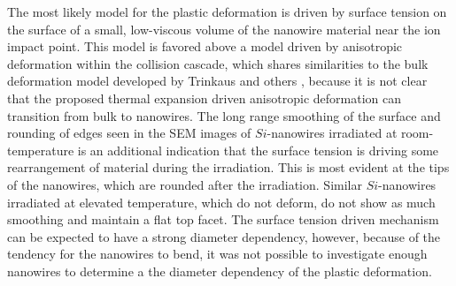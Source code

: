 The most likely model for the plastic deformation is driven by surface tension on the surface of a small, low-viscous volume of the nanowire material near the ion impact point. This model is favored above a model driven by anisotropic deformation within the collision cascade, which shares similarities to the bulk deformation model developed by Trinkaus and others \cite{trinkaus_viscoelastic_1995,baumer_prediction_2014}, because it is not clear that the proposed thermal expansion driven anisotropic deformation can transition from bulk to nanowires. The long range smoothing of the surface and rounding of edges seen in the SEM images of $Si$-nanowires irradiated at room-temperature is an additional indication that the surface tension is driving some rearrangement of material during the irradiation. This is most evident at the tips of the nanowires, which are rounded after the irradiation. Similar $Si$-nanowires irradiated at elevated temperature, which do not deform, do not show as much smoothing and maintain a flat top facet. The surface tension driven mechanism can be expected to have a strong diameter dependency, however, because of the tendency for the nanowires to bend, it was not possible to investigate enough nanowires to determine a the diameter dependency of the plastic deformation. 





